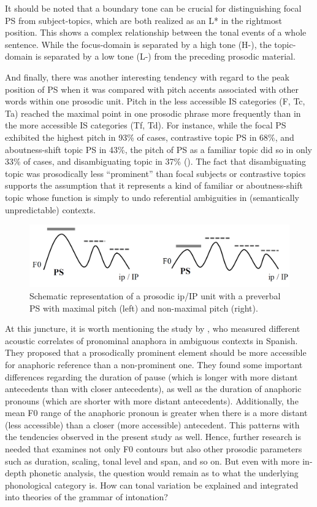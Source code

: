 \documentclass[output=paper]{langsci/langscibook}
\begin{document}
It should be noted that a boundary tone can be crucial for distinguishing focal PS from subject-topics, which are both realized as an L* in the rightmost position. This shows a complex relationship between the tonal events of a whole sentence. While the focus-domain is separated by a high tone (H-), the topic-domain is separated by a low tone (L-) from the preceding prosodic material.

And finally, there was another interesting tendency with regard to the peak position of PS when it was compared with pitch accents associated with other words within one prosodic unit. Pitch in the less accessible IS categories (F, Tc, Ta) reached the maximal point in one prosodic phrase more frequently than in the more accessible IS categories (Tf, Td). For instance, while the focal PS exhibited the highest pitch in 93\% of cases, contrastive topic PS in 68\%, and aboutness-shift topic PS in 43\%, the pitch of PS as a familiar topic did so in only 33\% of cases, and disambiguating topic in 37\% (). The fact that disambiguating topic was prosodically less ``prominent'' than focal subjects or contrastive topics supports the assumption that it represents a kind of familiar or aboutness-shift topic whose function is simply to undo referential ambiguities in (semantically unpredictable) contexts.\largerpage[-3]

  
\begin{figure}
\includegraphics[width=.8\textwidth]{figures/pes-img20new.png}
 \caption{Schematic representation of a prosodic ip/IP unit with a preverbal PS with maximal pitch (left) and non-maximal pitch (right).}
 \label{fig:pes:20}
\end{figure}
 
At this juncture, it is worth mentioning the study by \citet{Rello2012}, who measured different acoustic correlates of pronominal anaphora in ambiguous contexts in Spanish. They proposed that a prosodically prominent element should be more accessible for anaphoric reference than a non-prominent one. They found some important differences regarding the duration of pause (which is longer with more distant antecedents than with closer antecedents), as well as the duration of anaphoric pronouns (which are shorter with more distant antecedents). Additionally, the mean F0 range of the anaphoric pronoun is greater when there is a more distant (less accessible) than a closer (more accessible) antecedent. This patterns with the tendencies observed in the present study as well. Hence, further research is needed that examines not only F0 contours but also other prosodic parameters such as duration, scaling, tonal level and span, and so on. But even with more in-depth phonetic analysis, the question would remain as to what the underlying phonological category is. How can tonal variation be explained and integrated into theories of the grammar of intonation? 
\end{document}
